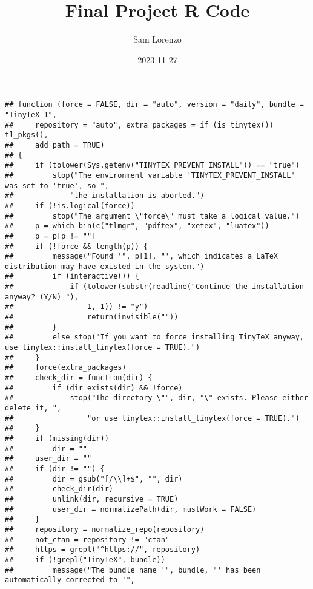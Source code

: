 \documentclass[
]{article}
\title{Final Project R Code}
\author{Sam Lorenzo}
\date{2023-11-27}
\newenvironment{Shaded}{\begin{snugshade}}{\end{snugshade}}
\newcommand{\AttributeTok}[1]{\textcolor[rgb]{0.77,0.63,0.00}{#1}}
\newcommand{\ConstantTok}[1]{\textcolor[rgb]{0.00,0.00,0.00}{#1}}
\newcommand{\FunctionTok}[1]{\textcolor[rgb]{0.00,0.00,0.00}{#1}}
\newcommand{\NormalTok}[1]{#1}
\newcommand{\SpecialCharTok}[1]{\textcolor[rgb]{0.00,0.00,0.00}{#1}}
\begin{document}
\maketitle

\begin{Shaded}
\end{Shaded}

\begin{verbatim}
## function (force = FALSE, dir = "auto", version = "daily", bundle = "TinyTeX-1", 
##     repository = "auto", extra_packages = if (is_tinytex()) tl_pkgs(), 
##     add_path = TRUE) 
## {
##     if (tolower(Sys.getenv("TINYTEX_PREVENT_INSTALL")) == "true") 
##         stop("The environment variable 'TINYTEX_PREVENT_INSTALL' was set to 'true', so ", 
##             "the installation is aborted.")
##     if (!is.logical(force)) 
##         stop("The argument \"force\" must take a logical value.")
##     p = which_bin(c("tlmgr", "pdftex", "xetex", "luatex"))
##     p = p[p != ""]
##     if (!force && length(p)) {
##         message("Found '", p[1], "', which indicates a LaTeX distribution may have existed in the system.")
##         if (interactive()) {
##             if (tolower(substr(readline("Continue the installation anyway? (Y/N) "), 
##                 1, 1)) != "y") 
##                 return(invisible(""))
##         }
##         else stop("If you want to force installing TinyTeX anyway, use tinytex::install_tinytex(force = TRUE).")
##     }
##     force(extra_packages)
##     check_dir = function(dir) {
##         if (dir_exists(dir) && !force) 
##             stop("The directory \"", dir, "\" exists. Please either delete it, ", 
##                 "or use tinytex::install_tinytex(force = TRUE).")
##     }
##     if (missing(dir)) 
##         dir = ""
##     user_dir = ""
##     if (dir != "") {
##         dir = gsub("[/\\]+$", "", dir)
##         check_dir(dir)
##         unlink(dir, recursive = TRUE)
##         user_dir = normalizePath(dir, mustWork = FALSE)
##     }
##     repository = normalize_repo(repository)
##     not_ctan = repository != "ctan"
##     https = grepl("^https://", repository)
##     if (!grepl("TinyTeX", bundle)) 
##         message("The bundle name '", bundle, "' has been automatically corrected to '", 

\end{verbatim}
\end{document}
